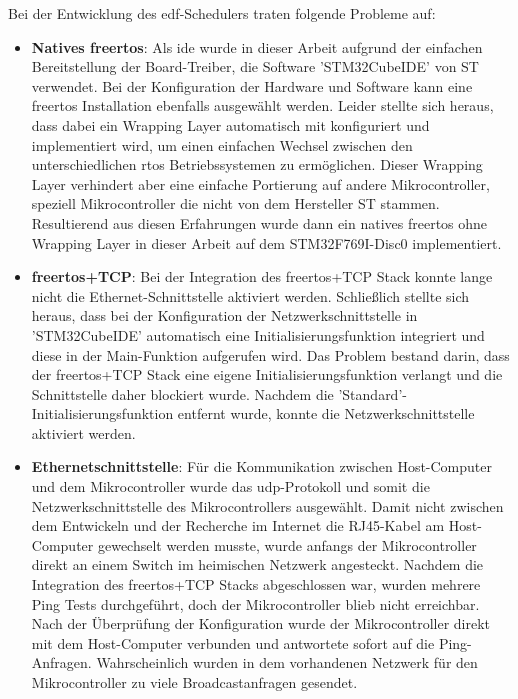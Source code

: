 \documentclass[../EDF Master Thesis.tex]{subfiles}
\begin{document}
    Bei der Entwicklung des \ac{edf}-Schedulers traten folgende Probleme auf:
    \begin{itemize}
        \item \textbf{Natives \ac{freertos}}: Als \ac{ide} wurde in dieser Arbeit aufgrund der einfachen Bereitstellung der Board-Treiber, die Software 'STM32CubeIDE' von ST verwendet.
            Bei der Konfiguration der Hardware und Software kann eine \ac{freertos} Installation ebenfalls ausgewählt werden.
            Leider stellte sich heraus, dass dabei ein Wrapping Layer automatisch mit konfiguriert und implementiert wird, um einen einfachen Wechsel zwischen den unterschiedlichen \ac{rtos} Betriebssystemen zu ermöglichen.
            Dieser Wrapping Layer verhindert aber eine einfache Portierung auf andere Mikrocontroller, speziell Mikrocontroller die nicht von dem Hersteller ST stammen.
            Resultierend aus diesen Erfahrungen wurde dann ein natives \ac{freertos} ohne Wrapping Layer in dieser Arbeit auf dem STM32F769I-Disc0 implementiert.
        \item \textbf{\ac{freertos}+TCP}: Bei der Integration des \ac{freertos}+TCP Stack konnte lange nicht die Ethernet-Schnittstelle aktiviert werden.
            Schließlich stellte sich heraus, dass bei der Konfiguration der Netzwerkschnittstelle in 'STM32CubeIDE' automatisch eine Initialisierungsfunktion integriert und diese in der Main-Funktion aufgerufen wird.
            Das Problem bestand darin, dass der \ac{freertos}+TCP Stack eine eigene Initialisierungsfunktion verlangt und die Schnittstelle daher blockiert wurde.
            Nachdem die 'Standard'-Initialisierungsfunktion entfernt wurde, konnte die Netzwerkschnittstelle aktiviert werden.
        \item \textbf{Ethernetschnittstelle}: Für die Kommunikation zwischen Host-Computer und dem Mikrocontroller wurde das \ac{udp}-Protokoll und somit die Netzwerkschnittstelle des Mikrocontrollers ausgewählt.
            Damit nicht zwischen dem Entwickeln und der Recherche im Internet die RJ45-Kabel am Host-Computer gewechselt werden musste, wurde anfangs der Mikrocontroller direkt an einem Switch im heimischen Netzwerk angesteckt.
            Nachdem die Integration des \ac{freertos}+TCP Stacks abgeschlossen war, wurden mehrere Ping Tests durchgeführt, doch der Mikrocontroller blieb nicht erreichbar.
            Nach der Überprüfung der Konfiguration wurde der Mikrocontroller direkt mit dem Host-Computer verbunden und antwortete sofort auf die Ping-Anfragen.
            Wahrscheinlich wurden in dem vorhandenen Netzwerk für den Mikrocontroller zu viele Broadcastanfragen gesendet.

\end{itemize}
\end{document}

